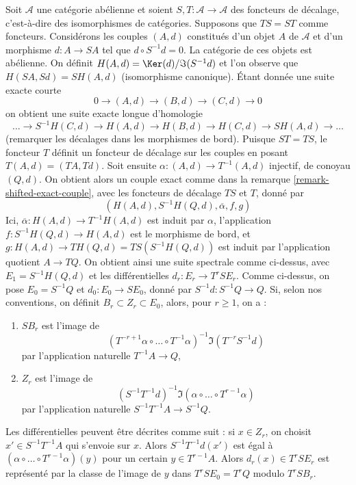 \begin{remark}[Variante]
\label{remark-differential-object-selfmap}
Soit $\mathcal{A}$ une catégorie abélienne et soient
$S, T : \mathcal{A} \to \mathcal{A}$ des foncteurs de décalage, c'est-à-dire des
isomorphismes de catégories. Supposons que $TS = ST$ comme foncteurs.
Considérons les couples $(A, d)$ constitués d'un objet $A$ de $\mathcal{A}$
et d'un morphisme $d : A \to SA$ tel que $d \circ S^{-1}d = 0$.
La catégorie de ces objets est abélienne.
On définit $H(A, d) = \Ker(d)/\Im(S^{-1}d)$ et l'on observe que
$H(SA, Sd) = SH(A, d)$ (isomorphisme canonique).
Étant donnée une suite exacte courte
$$
0 \to (A, d) \to (B, d) \to (C, d) \to 0
$$
on obtient une suite exacte longue d'homologie
$$
\ldots \to S^{-1}H(C, d) \to
H(A, d) \to H(B, d) \to H(C, d) \to SH(A, d) \to \ldots
$$
(remarquer les décalages dans les morphismes de bord). Puisque $ST = TS$, le foncteur
$T$ définit un foncteur de décalage sur les couples en posant $T(A, d) = (TA, Td)$.
Soit ensuite $\alpha : (A, d) \to T^{-1}(A, d)$ injectif, de
conoyau $(Q, d)$. On obtient alors un couple exact comme dans la
remarque \ref{remark-shifted-exact-couple}, avec les foncteurs de décalage $TS$ et
$T$, donné par
$$
(H(A, d), S^{-1}H(Q, d), \overline{\alpha}, f, g)
$$
Ici, $\overline{\alpha} : H(A, d) \to T^{-1}H(A, d)$ est induit par $\alpha$,
l'application $f : S^{-1}H(Q, d) \to H(A, d)$ est le morphisme
de bord, et $g : H(A, d) \to TH(Q, d) = TS(S^{-1}H(Q, d))$ est induit par
l'application quotient $A \to TQ$. On obtient ainsi une suite spectrale comme ci-dessus,
avec $E_1 = S^{-1}H(Q, d)$ et les différentielles $d_r : E_r \to T^rSE_r$.
Comme ci-dessus, on pose $E_0 = S^{-1}Q$ et $d_0 : E_0 \to SE_0$, donné par
$S^{-1}d : S^{-1}Q \to Q$. Si, selon nos conventions, on définit
$B_r \subset Z_r \subset E_0$, alors, pour $r \geq 1$, on a :
\begin{enumerate}
\item $SB_r$ est l'image de
$$
(T^{-r + 1}\alpha \circ \ldots \circ T^{-1}\alpha)^{-1}
\Im(T^{-r}S^{-1}d)
$$
par l'application naturelle $T^{-1}A \to Q$,
\item $Z_r$ est l'image de
$$
(S^{-1}T^{-1}d)^{-1}
\Im(\alpha \circ \ldots \circ T^{r - 1}\alpha)
$$
par l'application naturelle $S^{-1}T^{-1}A \to S^{-1}Q$.
\end{enumerate}
Les différentielles peuvent être décrites comme suit : si $x \in Z_r$, on
choisit $x' \in S^{-1}T^{-1}A$ qui s'envoie sur $x$. Alors $S^{-1}T^{-1}d(x')$
est égal à $(\alpha \circ \ldots \circ T^{r - 1}\alpha)(y)$ pour un certain
$y \in T^{r - 1}A$. Alors $d_r(x) \in T^rSE_r$ est représenté par la
classe de l'image de $y$ dans $T^rSE_0 = T^rQ$ modulo $T^rSB_r$.
\end{remark}
